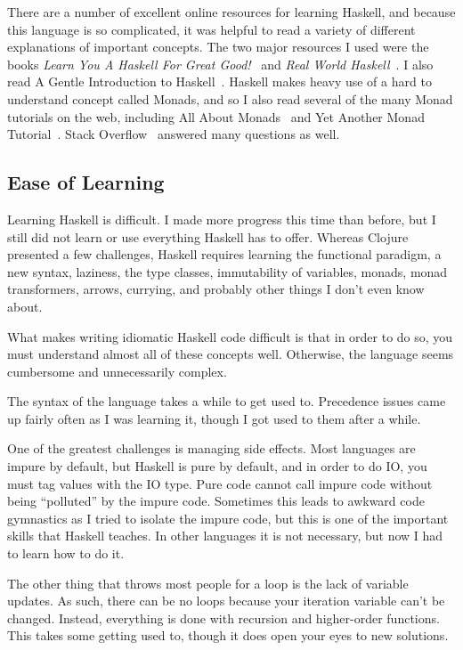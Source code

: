\documentclass{article}
\begin{document}
There are a number of excellent online resources for learning Haskell, and
because this language is so complicated, it was helpful to read a variety of
different explanations of important concepts.  The two major resources I used
were the books \emph{Learn You A Haskell For Great
Good!}~\cite{learnyouahaskell} and \emph{Real World
Haskell}~\cite{realworldhaskell}.  I also read A Gentle Introduction to
Haskell~\cite{gentleintroduction}.  Haskell makes heavy use of a hard to
understand concept called Monads, and so I also read several of the many Monad
tutorials on the web, including All About Monads~\cite{allaboutmonads} and Yet
Another Monad Tutorial~\cite{yamt}.  Stack Overflow~\cite{stackoverflow}
answered many questions as well.

\subsection{Ease of Learning}

Learning Haskell is difficult.  I made more progress this time than before,
but I still did not learn or use everything Haskell has to offer.  Whereas
Clojure presented a few challenges, Haskell requires learning the functional
paradigm, a new syntax, laziness, the type classes, immutability of variables,
monads, monad transformers, arrows, currying, and probably other things I don't
even know about.

What makes writing idiomatic Haskell code difficult is that in order to do so,
you must understand almost all of these concepts well.  Otherwise, the
language seems cumbersome and unnecessarily complex.

The syntax of the language takes a while to get used to.  Precedence issues came
up fairly often as I was learning it, though I got used to them after a while.

One of the greatest challenges is managing side effects.  Most languages are
impure by default, but Haskell is pure by default, and in order to do IO, you
must tag values with the IO type.  Pure code cannot call impure code without
being ``polluted'' by the impure code.  Sometimes this leads to awkward code
gymnastics as I tried to isolate the impure code, but this is one of the
important skills that Haskell teaches.  In other languages it is not necessary,
but now I had to learn how to do it.

The other thing that throws most people for a loop is the lack of variable
updates.  As such, there can be no loops because your iteration variable can't
be changed.  Instead, everything is done with recursion and higher-order
functions.  This takes some getting used to, though it does open your eyes to
new solutions.
\end{document}
